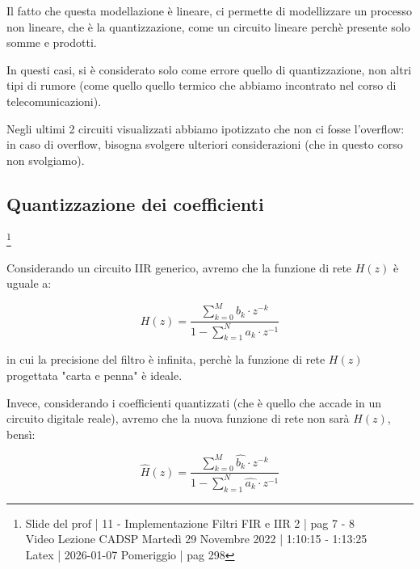Il fatto che questa modellazione è lineare, ci permette di modellizzare un processo non lineare, che è la quantizzazione, come un circuito lineare perchè presente solo somme e prodotti. \newline 

In questi casi, si è considerato solo come errore quello di quantizzazione, non altri tipi di rumore (come quello quello termico che abbiamo incontrato nel corso di telecomunicazioni). \newline 

Negli ultimi 2 circuiti visualizzati abbiamo ipotizzato che non ci fosse l'overflow: 
in caso di overflow, bisogna svolgere ulteriori considerazioni (che in questo corso non svolgiamo). \newline 

\newpage 

\subsection{Quantizzazione dei coefficienti}

\footnote{ 
    Slide del prof | 11 - Implementazione Filtri FIR e IIR 2 | pag 7 - 8\\
    Video Lezione CADSP Martedì 29 Novembre 2022 | 1:10:15 - 1:13:25 \\ 
    Latex | 2026-01-07 Pomeriggio | pag 298     
} 

Considerando un circuito IIR generico, avremo che la funzione di rete $H \left(z\right)$ è uguale a: 

{
    \Large 
    \begin{equation}
        H \left(z\right) 
        = 
        \dfrac{
            \sum_{k = 0}^{M}
            b_k \cdot z^{-k}
        }{
            1 - \sum_{k = 1}^{N} a_k \cdot z^{-1} 
        }
    \end{equation}
}

in cui la precisione del filtro è infinita, perchè la funzione di rete $H \left(z\right)$ progettata "carta e penna" è ideale. \newline 

Invece, considerando i coefficienti quantizzati (che è quello che accade in un circuito digitale reale), avremo che la nuova funzione di rete non sarà $H \left(z\right)$, bensì: 

{
    \Large 
    \begin{equation}
        \hat{H} \left(z\right) 
        = 
        \dfrac{
            \sum_{k = 0}^{M}
            \hat{b_k} \cdot z^{-k}
        }{
            1 - \sum_{k = 1}^{N} \hat{a_k} \cdot z^{-1} 
        }
    \end{equation}
}

